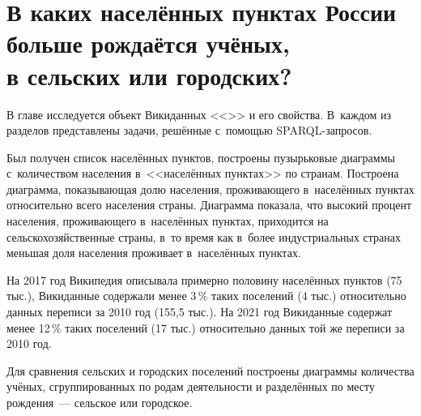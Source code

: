 \chapter[В каких населённых пунктах России больше рождаётся учёных, в сельских или городских?]{В каких населённых пунктах России больше рождаётся учёных,\\в сельских или городских?}
\label{ch:human-settlement}

В главе исследуется объект Викиданных <<>> и его свойства. 
В~каждом из разделов представлены задачи, решённые с~помощью SPARQL-запросов. 
%

Был получен список населённых пунктов, 
построены пузырьковые диаграммы с~количеством населения в~<<населённых пунктах>> по странам. 
Построена диаграмма, показывающая долю населения, 
проживающего в~населённых пунктах относительно всего населения страны. 
Диаграмма показала, что высокий процент населения, проживающего в~населённых пунктах, 
приходится на сельскохозяйственные страны, в~то время как в~более индустриальных странах 
меньшая доля населения проживает в~населённых пунктах. 
%

На 2017 год Википедия описывала примерно половину населённых пунктов (75 тыс.), 
Викиданные содержали менее 3\,\% таких поселений (4 тыс.) относительно данных переписи за 2010 год (155,5 тыс.). 
На 2021 год Викиданные содержат менее 12\,\% таких поселений (17 тыс.) 
относительно данных той же переписи за 2010 год. 

Для сравнения сельских и городских поселений 
построены диаграммы количества учёных, сгруппированных по родам деятельности 
и разделённых по месту рождения~--- сельское или городское.

